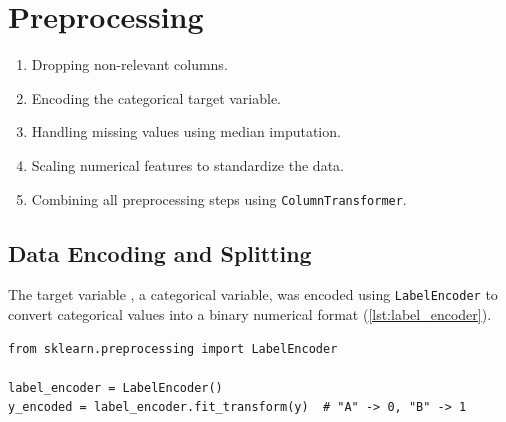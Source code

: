 \section{Preprocessing}\label{s:preprocessing}

\begin{enumerate}
    \item Dropping non-relevant columns.
    \item Encoding the categorical target variable.
    \item Handling missing values using median imputation.
    \item Scaling numerical features to standardize the data.
    \item Combining all preprocessing steps using \texttt{ColumnTransformer}.
\end{enumerate}

\subsection{Data Encoding and Splitting}\label{ss:encoding}
The target variable , a categorical variable, was encoded using \texttt{LabelEncoder} to convert
categorical values into a binary numerical format (\cref{lst:label_encoder}).

\begin{lstlisting}[style=python, caption={Encoding the target variable}, label={lst:label_encoder}]
from sklearn.preprocessing import LabelEncoder

label_encoder = LabelEncoder()
y_encoded = label_encoder.fit_transform(y)  # "A" -> 0, "B" -> 1
\end{lstlisting}


